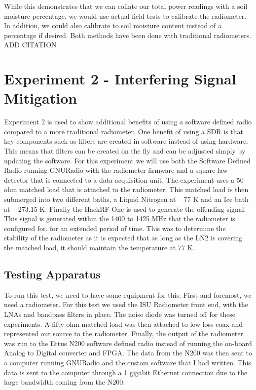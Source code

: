 While this demonstrates that we can collate our total power readings with a soil moisture percentage, we would use actual field tests to calibrate the radiometer.  In addition, we could also calibrate to soil moisture content instead of a percentage if desired.  Both methods have been done with traditional radiometers. ADD CITATION

\section{Experiment 2 - Interfering Signal Mitigation}
Experiment 2 is used to show additional benefits of using a software defined radio compared to a more traditional radiometer.  One benefit of using a SDR is that key components such as filters are created in software instead of using hardware.  This means that filters can be created on the fly and can be adjusted simply by updating the software.  For this experiment we will use both the Software Defined Radio running GNURadio with the radiometer firmware and a square-law detector that is connected to a data acquisition unit.  The experiment uses a 50 ohm matched load that is attached to the radiometer.  This matched load is then submerged into two different baths, a Liquid Nitrogen at ~ 77 K and an Ice bath at ~ 273.15 K.  Finally the HackRF One is used to generate the offending signal.  This signal is generated within the 1400 to 1425 MHz that the radiometer is configured for.   for an extended period of time.  This was to determine the stability of the radiometer as it is expected that as long as the LN2 is covering the matched load, it should maintain the temperature at 77 K.  

\subsection{Testing Apparatus}
To run this test, we need to have some equipment for this.  First and foremost, we need a radiometer.  For this test we used the ISU Radiometer front end, with the LNAs and bandpass filters in place.  The noise diode was turned off for these experiments.  A fifty ohm matched load was then attached to low loss coax and represented our source to the radiometer.  Finally, the output of the radiometer was run to the Ettus N200 software defined radio instead of running the on-board Analog to Digital converter and FPGA.  The data from the N200 was then sent to a computer running GNURadio and the custom software that I had written.  This data is sent to the computer through a 1 gigabit Ethernet connection due to the large bandwidth coming from the N200.

